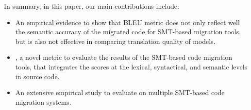 
In summary, in this paper, our main contributions include:

\begin{itemize}
	\item An empirical evidence to show that BLEU metric does not only reflect
well the semantic accuracy of the migrated code for SMT-based
migration tools, but is also not effective in comparing translation
quality of models.

	\item {\model}, a novel metric to evaluate the results of the SMT-based
code migration tools, that integrates the scores at the lexical,
syntactical, and semantic levels in source code.

	\item An extensive empirical study to evaluate {\model} on multiple SMT-based code migration systems.
\end{itemize}







